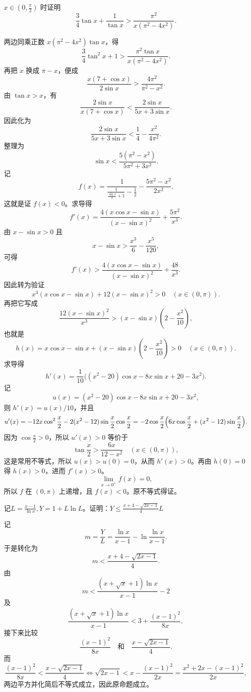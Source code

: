 \begin{example}
\( x \in \left(0, \frac{\pi}{2}\right) \) 时证明
\[
\frac{3}{4} \tan x + \frac{1}{\tan x} > \frac{\pi^{2}}{x(\pi^{2}-4x^{2})}.
\]
\end{example}
\begin{solution}
两边同乘正数 \(x(\pi^2-4x^2)\tan x\)，得
\[
\frac{3}{4} \tan^2 x + 1 > \frac{\pi^2 \tan x}{x(\pi^2-4x^2)}.
\]
再把 \(x\) 换成 \(\pi-x\)，便成
\[
\frac{x(7 + \cos x)}{2 \sin x} > \frac{4\pi^2}{\pi^2 - x^2}.
\]
由 \(\tan x>x\)，有
\[
\frac{2 \sin x}{x(7 + \cos x)} < \frac{2 \sin x}{5x + 3 \sin x}.
\]
因此化为
\[
\frac{2 \sin x}{5x + 3 \sin x} < \frac{1}{4} - \frac{x^2}{4\pi^2}.
\]
整理为
\[
\sin x < \frac{5(\pi^2 - x^2)}{5\pi^2 + 3x^2}.
\]
记
\[
f(x) = \frac{1}{\frac{1}{\frac{\sin x}{x} + 1} - \frac{1}{2}} - \frac{5\pi^2 - x^2}{2x^2}.
\]
这就是证 \(f(x)<0\)。求导得
\[
f'(x) = \frac{4(x \cos x - \sin x)}{(x - \sin x)^2} + \frac{5\pi^2}{x^3}.
\]
由 \(x-\sin x>0\) 且
\[
x-\sin x>\frac{x^3}{6}-\frac{x^5}{120},
\]
可得
\[
f'(x) > \frac{4(x \cos x - \sin x)}{(x - \sin x)^2} + \frac{48}{x^3}.
\]
因此转为验证
\[
x^3(x \cos x - \sin x) + 12(x - \sin x)^2 > 0 \quad (x \in (0,\pi)).
\]
再把它写成
\[
\frac{12(x - \sin x)^2}{x^3} > (x - \sin x)\left(2 - \frac{x^2}{10}\right),
\]
也就是
\[
h(x) = x \cos x - \sin x + (x - \sin x)\left(2 - \frac{x^2}{10}\right) > 0 \quad (x \in (0,\pi)).
\]
求导得
\[
h'(x) = \frac{1}{10} \bigl( (x^2 - 20)\cos x - 8x \sin x + 20 - 3x^2 \bigr).
\]
记
\[
u(x) = (x^2 - 20)\cos x - 8x \sin x + 20 - 3x^2,
\]
则 \(h'(x)=u(x)/10\)，并且
\[
u'(x) = -12x \cos^2 \frac{x}{2} - 2(x^2 - 12)\sin \frac{x}{2} \cos \frac{x}{2} = -2 \cos \frac{x}{2} \Bigl( 6x \cos \frac{x}{2} + (x^2 - 12)\sin \frac{x}{2} \Bigr).
\]
因为 \(\cos \frac{x}{2}>0\)，所以 \(u'(x)>0\) 等价于
\[
\tan \frac{x}{2} > \frac{6x}{12 - x^2} \quad (x \in (0,\pi)),
\]
这是常用不等式，所以 \(u(x)>u(0)=0\)，从而 \(h'(x)>0\)。再由 \(h(0)=0\) 得 \(h(x)>0\)，进而 \(f'(x)>0\)。
\[
\lim_{x \to 0^+} f(x) = 0,
\]
所以 \(f\) 在 \((0,\pi)\) 上递增，且 \(f(x)<0\)。原不等式得证。
\end{solution}

\begin{example}
记$L = \frac{x - 1}{\ln x}, Y = 1 + L \ln L$。证明：$Y \leqslant \frac{x + 4 - \sqrt{2x - 1}}{4} L$
\end{example}
\begin{solution}
记
\[
m=\frac{Y}{L}=\frac{\ln x}{x - 1} - \ln \frac{\ln x}{x - 1}.
\]
于是转化为
\[
m<\frac{x + 4 - \sqrt{2x - 1}}{4}.
\]
由
\[
m < \frac{(x + \sqrt{x} + 1)\ln x}{x - 1} - 2
\]
及
\[
\frac{(x + \sqrt{x} + 1)\ln x}{x - 1} < 3 + \frac{(x - 1)^2}{8x},
\]
接下来比较
\[
\frac{(x - 1)^2}{8x}\quad\text{和}\quad \frac{x - \sqrt{2x - 1}}{4}.
\]
而
\[
\frac{(x - 1)^2}{8x} < \frac{x - \sqrt{2x - 1}}{4}
\iff
\sqrt{2x - 1} < x - \frac{(x - 1)^2}{2x}=\frac{x^2+2x-(x-1)^2}{2x},
\]
两边平方并化简后不等式成立，因此原命题成立。
\end{solution}

